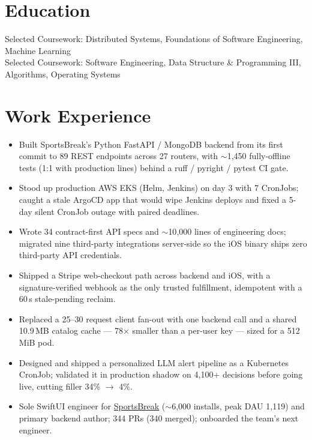 \documentclass[11pt, letterpaper]{article}
\begin{document}

\section{Education}
Selected Coursework: Distributed Systems, Foundations of Software Engineering, Machine Learning\\[1pt]
Selected Coursework: Software Engineering, Data Structure \& Programming III, Algorithms, Operating Systems

\section{Work Experience}
\begin{itemize}
  \item Built SportsBreak's Python FastAPI / MongoDB backend from its first commit to 89 REST endpoints across 27 routers, with $\sim$1{,}450 fully-offline tests (1:1 with production lines) behind a ruff / pyright / pytest CI gate.
  \item Stood up production AWS EKS (Helm, Jenkins) on day 3 with 7 CronJobs; caught a stale ArgoCD app that would wipe Jenkins deploys and fixed a 5-day silent CronJob outage with paired deadlines.
  \item Wrote 34 contract-first API specs and $\sim$10{,}000 lines of engineering docs; migrated nine third-party integrations server-side so the iOS binary ships zero third-party API credentials.
  \item Shipped a Stripe web-checkout path across backend and iOS, with a signature-verified webhook as the only trusted fulfillment, idempotent with a 60\,s stale-pending reclaim.
  \item Replaced a 25--30 request client fan-out with one backend call and a shared 10.9\,MB catalog cache --- 78$\times$ smaller than a per-user key --- sized for a 512\,MiB pod.
  \item Designed and shipped a personalized LLM alert pipeline as a Kubernetes CronJob; validated it in production shadow on 4{,}100+ decisions before going live, cutting filler 34\% $\to$ 4\%.
  \item Sole SwiftUI engineer for \href{https://apps.apple.com/app/id6762649287}{SportsBreak} ($\sim$6{,}000 installs, peak DAU 1{,}119) and primary backend author; 344 PRs (340 merged); onboarded the team's next engineer.
\end{itemize}
\end{document}
